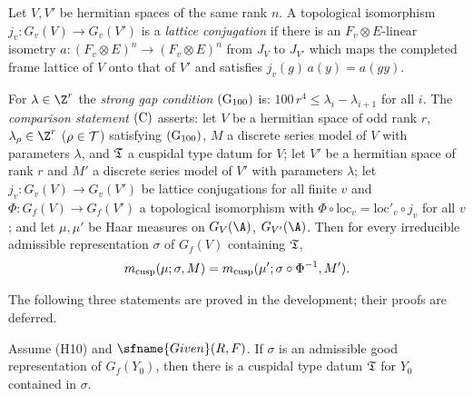 \begin{definition}\label{pf:multnc:def-latconj}
Let $V,V'$ be hermitian spaces of the same rank $n$. A topological isomorphism $j_v\colon G_v(V)\to G_v(V')$ is a
\emph{lattice conjugation} if there is an $F_v\otimes E$-linear isometry $a\colon(F_v\otimes E)^n\to(F_v\otimes E)^n$ from
$J_V$ to $J_{V'}$ which maps the completed frame lattice of $V$ onto that of $V'$ and satisfies $j_v(g)\,a(y)=a(gy)$.
\end{definition}

\begin{definition}\label{pf:multnc:def-trcusp}
For $\lambda\in\Z^r$ the \emph{strong gap condition} $\textup{(G$_{100}$)}$ is: $100\,r^4\le\lambda_i-\lambda_{i+1}$ for all
$i$. The \emph{comparison statement} $\textup{(C)}$ asserts: let $V$ be a hermitian space of odd rank $r$,
$\lambda_\rho\in\Z^r$ ($\rho\in\mathcal{T}$) satisfying $\textup{(G$_{100}$)}$, $M$ a discrete series model of $V$ with
parameters $\lambda$, and $\mathfrak{T}$ a cuspidal type datum for $V$; let $V'$ be a hermitian space of rank $r$ and $M'$ a
discrete series model of $V'$ with parameters $\lambda$; let $j_v\colon G_v(V)\to G_v(V')$ be lattice conjugations for
all finite $v$ and $\Phi\colon G_f(V)\to G_f(V')$ a topological isomorphism with
$\Phi\circ\mathrm{loc}_v=\mathrm{loc}'_v\circ j_v$ for all $v$; and let $\mu,\mu'$ be Haar measures on $G_V(\A)$,
$G_{V'}(\A)$. Then for every irreducible admissible representation $\sigma$ of $G_f(V)$ containing $\mathfrak{T}$,
\begin{equation}\label{pf:multnc:eq-trcusp}
m_{\mathrm{cusp}}(\mu;\sigma,M)=m_{\mathrm{cusp}}(\mu';\sigma\circ\Phi^{-1},M').
\end{equation}
\end{definition}

The following three statements are proved in the development; their proofs are deferred.

\begin{lemma}\label{pf:multnc:typevec}
Assume (H10) and $\sfname{Given}(R,F)$. If $\sigma$ is an admissible good representation of $G_f(Y_0)$, then there is a
cuspidal type datum $\mathfrak{T}$ for $Y_0$ contained in $\sigma$.
\end{lemma}

